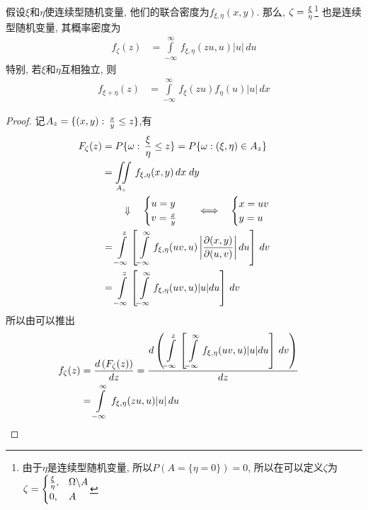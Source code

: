 \begin{division_of_two_random_var}[随机变量商的分布]
    \label{lem:rvb}
    假设\(\xi\)和\(\eta\)使连续型随机变量, 他们的联合密度为\(f_{\xi,\eta}(x, y)\).
    那么, \(\zeta = {\xi\over\eta}\)\footnote{由于\(\eta\)是连续型随机变量, 所以\(P(A = \{\eta = 0\}) = 0\), 所以在可以定义\(\zeta\)为\(\zeta = \begin{cases}{\xi\over\eta}, & \Omega\backslash A\cr 0, & A\end{cases}\)}
    也是连续型随机变量, 其概率密度为
    \begin{align}
        f_{\zeta}(z) &= \int\limits_{-\infty}^{\infty}\,f_{\xi, \eta}(zu, u)|u|\,du
    \end{align}
    特别, 若\(\xi\)和\(\eta\)互相独立, 则
    \begin{align}
        f_{\xi + \eta}(z) &= \int\limits_{-\infty}^{\infty}\,f_{\xi}(zu)f_{\eta}(u)|u|\,dx
    \end{align}
    \begin{proof}
    记\(A_z = \{(x, y):\,{x\over y}\le z\}\),有
    \begin{align}
        \label{equ:rvc}
        F_{\zeta}(z) &= P\{\omega:\,{\xi\over\eta}\le z\}
        = P\{\omega:(\xi, \eta)\in A_z\}\cr
        &= \iint\limits_{A_z}\,f_{\xi, \eta}(x, y)\,dx\;dy\cr
        &\qquad\Downarrow\quad\begin{cases}u = y\cr v = {x\over y}\end{cases}\quad\Longleftrightarrow\quad \begin{cases}x = uv\cr y = u\end{cases}\cr
        &= \int\limits_{-\infty}^{z}\left[\int\limits_{-\infty}^{\infty}f_{\xi,\eta}(uv, u)\left|{\partial(x, y)\over\partial(u, v)}\right|du\right]\,dv\cr
        &= \int\limits_{-\infty}^{z}\left[\int\limits_{-\infty}^{\infty}f_{\xi,\eta}(uv, u)|u|du\right]\,dv
    \end{align}
    所以由可以推出
    \begin{align}
        f_{\zeta}(z) &= {d\left(F_{\zeta}(z)\right)\over dz}
        ={\displaystyle d\left(\int\limits_{-\infty}^{z}\left[\int\limits_{-\infty}^{\infty}f_{\xi,\eta}(uv, u)|u|du\right]\,dv\right)\over dz}\cr
        &= \int\limits_{-\infty}^{\infty}\,f_{\xi, \eta}(zu, u)|u|\,du
    \end{align}
    \end{proof}
\end{division_of_two_random_var}

